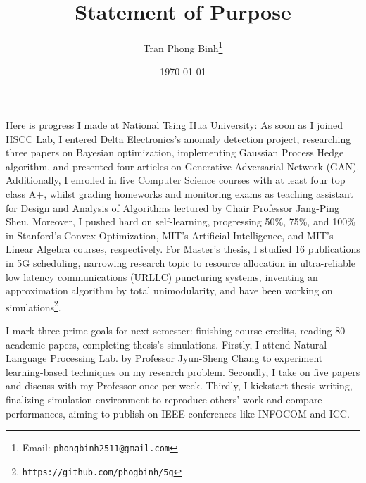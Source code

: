 \documentclass[12pt, letterpaper, oneside]{article}
\title{\textbf{Statement of Purpose}}
\author{Tran Phong Binh\thanks{Email: \texttt{phongbinh2511@gmail.com}}}
\date{\today}
\begin{document}
\maketitle

Here is progress I made at National Tsing Hua University: As soon as I joined HSCC Lab, I entered Delta Electronics's anomaly detection project, researching three papers on Bayesian optimization, implementing Gaussian Process Hedge algorithm, and presented four articles on Generative Adversarial Network (GAN). Additionally, I enrolled in five Computer Science courses with at least four top class A+, whilst grading homeworks and monitoring exams as teaching assistant for Design and Analysis of Algorithms lectured by Chair Professor Jang-Ping Sheu. Moreover, I pushed hard on self-learning, progressing 50\%, 75\%, and 100\% in Stanford's Convex Optimization, MIT's Artificial Intelligence, and MIT's Linear Algebra courses, respectively. For Master's thesis, I studied 16 publications in 5G scheduling, narrowing research topic to resource allocation in ultra-reliable low latency communications (URLLC) puncturing systems, inventing an approximation algorithm by total unimodularity, and have been working on simulations\footnote{\texttt{https://github.com/phogbinh/5g}}.

I mark three prime goals for next semester: finishing course credits, reading 80 academic papers, completing thesis's simulations. Firstly, I attend Natural Language Processing Lab. by Professor Jyun-Sheng Chang to experiment learning-based techniques on my research problem. Secondly, I take on five papers and discuss with my Professor once per week. Thirdly, I kickstart thesis writing, finalizing simulation environment to reproduce others' work and compare performances, aiming to publish on IEEE conferences like INFOCOM and ICC.
\end{document}
